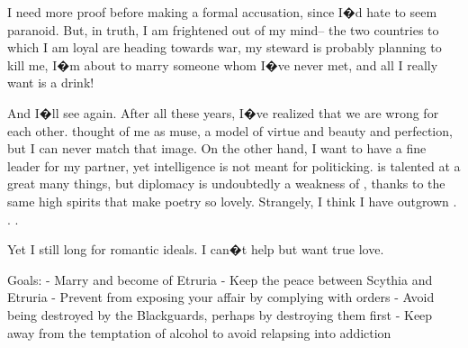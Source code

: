 \documentclass[char]{Kos}
\begin{document}
I need more proof before making a formal accusation, since I�d hate to seem paranoid. But, in truth, I am frightened out of my mind-- the two countries to which I am loyal are heading towards war, my steward is probably planning to kill me, I�m about to marry someone whom I�ve never met, and all I really want is a drink!

And I�ll see \cPoet{\nickname} again. After all these years, I�ve realized that we are wrong for each other. \cPoet{\They} thought of me as \cPoet{\their} muse, a model of virtue and beauty and perfection, but I can never match that image. On the other hand, I want to have a fine leader for my partner, yet \cPoet{\their} intelligence is not meant for politicking. \cPoet{\They} is talented at a great many things, but diplomacy is undoubtedly a weakness of \cPoet{\theirs}, thanks to the same high spirits that make \cPoet{\their} poetry so lovely. Strangely, I think I have outgrown \cPoet{\them} . . .

Yet I still long for \cPoet{\their} romantic ideals. I can�t help but want true love.

Goals:
- Marry \cGroom{\nickname} and become \cBride{\prince} of Etruria
- Keep the peace between Scythia and Etruria
- Prevent \cEtruriaKing{\nickname} from exposing your affair by complying with \cEtruriaKing{\their} orders
- Avoid being destroyed by the Blackguards, perhaps by destroying them first
- Keep away from the temptation of alcohol to avoid relapsing into addiction
\end{document}
